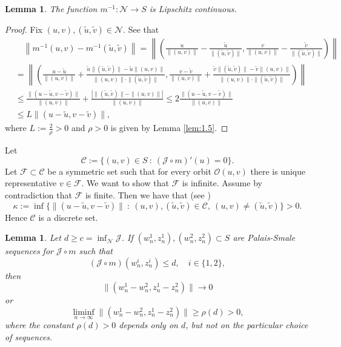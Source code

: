 \documentclass{scrartcl}
\newtheorem{Lem}[Th]{Lemma}
\newcommand{\cF}{{\mathcal F}}
\newcommand{\cJ}{{\mathcal J}}
\newcommand{\cN}{{\mathcal N}}
\numberwithin{equation}{section}
\begin{document}
\begin{Lem}\label{lem:lip}
The function $m^{-1} : \cN \rightarrow S$ is Lipschitz continuous.
\end{Lem}

\begin{proof}
Fix $(u,v), (\tilde{u}, \tilde{v}) \in \cN$. See that
\begin{align*}
&\quad \left\| m^{-1}(u,v) - m^{-1} (\tilde{u},\tilde{v}) \right\| = \left\| \left( \frac{u}{\|(u,v)\|} - \frac{\tilde{u}}{\|(\tilde{u},\tilde{v})\|}, \frac{v}{\|(u,v)\|} - \frac{\tilde{v}}{\|(\tilde{u},\tilde{v})\|} \right) \right\| \\
&= \left\| \left( \frac{u-\tilde{u}}{\|(u,v)\|} + \frac{\tilde{u} \| (\tilde{u},\tilde{v})\| - \tilde{u} \| (u,v)\|}{\|(u,v)\| \cdot \|(\tilde{u},\tilde{v})\|}, \frac{v-\tilde{v}}{\|(u,v)\|} + \frac{\tilde{v} \| (\tilde{u},\tilde{v})\| - \tilde{v} \| (u,v)\|}{\|(u,v)\| \cdot \|(\tilde{u},\tilde{v})\|} \right) \right\| \\
&\leq \frac{\|(u-\tilde{u}, v - \tilde{v})\|}{\|(u,v)\|} + \frac{\left| \|(\tilde{u},\tilde{v})\| - \|(u,v)\| \right|}{\|(u,v)\|} \leq 2 \frac{\|(u-\tilde{u}, v - \tilde{v})\|}{\|(u,v)\|} \\
&\leq L \| (u - \tilde{u}, v - \tilde{v}) \|,
\end{align*}
where $L := \frac{2}{\rho} > 0$ and $\rho > 0$ is given by Lemma \ref{lem:1.5}.
\end{proof}

Let 
$$
\mathscr{C} := \{ (u,v) \in S \ : \ (\cJ \circ m)'(u) = 0 \}.
$$
Let $\cF \subset \mathscr{C}$ be a symmetric set such that for every orbit $\mathcal{O}(u,v)$ there is unique representative $v \in \cF$. We want to show that $\cF$ is infinite. Assume by contradiction that $\cF$ is finite. Then we have that (see \cite{SzulkinWeth})
$$
\kappa := \inf \{ \|(u-\tilde{u}, v - \tilde{v}) \| \ : \ (u,v),(\tilde{u},\tilde{v}) \in \mathscr{C}, \ (u,v) \neq (\tilde{u}, \tilde{v}) \} > 0.
$$
Hence $\mathscr{C}$ is a discrete set.

\begin{Lem}
Let $d \geq c = \inf_{\cN} \cJ$. If $(w_n^1, z_n^1), (w_n^2, z_n^2) \subset S$ are Palais-Smale sequences for $\cJ \circ m$ such that
$$
(\cJ \circ m)(w_n^i, z_n^i) \leq d, \quad i \in \{1,2\},
$$
then
$$
\|(w_n^1 - w_n^2, z_n^1 - z_n^2)\| \to 0
$$
or
$$
\liminf_{n\to\infty} \|(w_n^1 - w_n^2, z_n^1 - z_n^2)\| \geq \rho(d) > 0,
$$
where the constant $\rho(d) > 0$ depends only on $d$, but not on the particular choice of sequences.
\end{Lem}
\end{document}

